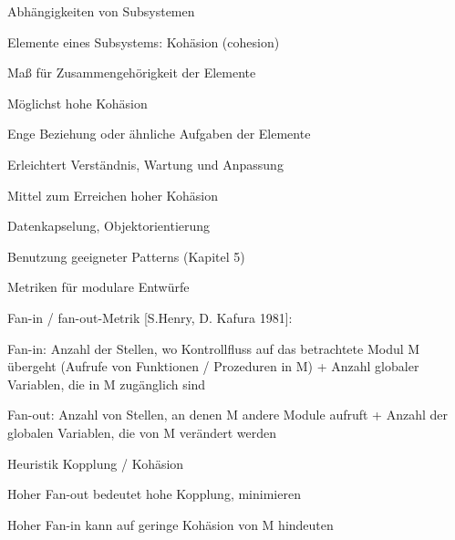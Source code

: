 \documentclass[a4paper]{article}
\begin{document}
\begin{multicols}{3}
  Abhängigkeiten von Subsystemen

  \begin{itemize*}
    \item Elemente eines Subsystems: Kohäsion (cohesion)
    \item Maß für Zusammengehörigkeit der Elemente
    \item Möglichst hohe Kohäsion
    \begin{itemize*}
      \item Enge Beziehung oder ähnliche Aufgaben der Elemente
      \item Erleichtert Verständnis, Wartung und Anpassung
    \end{itemize*}
    \item Mittel zum Erreichen hoher Kohäsion
    \begin{itemize*}
      \item Datenkapselung, Objektorientierung
      \item Benutzung geeigneter Patterns (Kapitel 5)
    \end{itemize*}
  \end{itemize*}

  Metriken für modulare Entwürfe
  \begin{itemize*}
    \item Fan-in / fan-out-Metrik [S.Henry, D. Kafura 1981]:
    \begin{itemize*}
      \item Fan-in: Anzahl der Stellen, wo Kontrollfluss auf das betrachtete Modul M übergeht (Aufrufe von Funktionen / Prozeduren in M) + Anzahl globaler Variablen, die in M zugänglich sind
      \item Fan-out: Anzahl von Stellen, an denen M andere Module aufruft + Anzahl der globalen Variablen, die von M verändert werden
    \end{itemize*}
    \item Heuristik Kopplung / Kohäsion
    \begin{itemize*}
      \item Hoher Fan-out bedeutet hohe Kopplung, minimieren
      \item Hoher Fan-in kann auf geringe Kohäsion von M hindeuten
    \end{itemize*}
  \end{itemize*}


\end{multicols}
\end{document}
